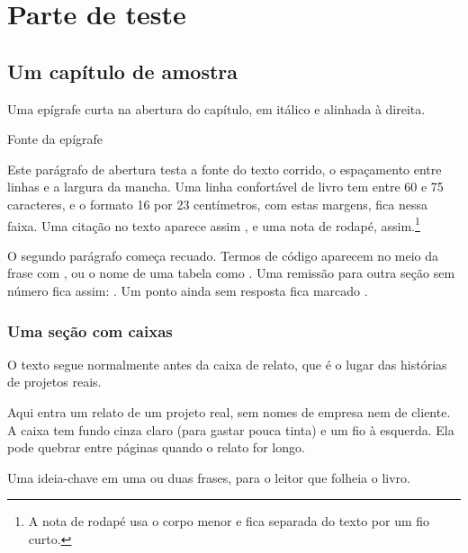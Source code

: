 \documentclass[11pt,twoside,openright,showtrims]{memoir}
\begin{document}
\mainmatter
\part{Parte de teste}
\label{parte:teste}

\chapter{Um capítulo de amostra}
\label{cap:amostra}

\epigraph{Uma epígrafe curta na abertura do capítulo, em itálico e alinhada à direita.}{Fonte da epígrafe}


Este parágrafo de abertura testa a fonte do texto corrido, o espaçamento entre linhas
e a largura da mancha. Uma linha confortável de livro tem entre 60 e 75 caracteres,
e o formato 16 por 23 centímetros, com estas margens, fica nessa faixa. Uma citação no
texto aparece assim \parencite{kimball2013}, e uma nota de rodapé, assim.\footnote{A nota
de rodapé usa o corpo menor e fica separada do texto por um fio curto.}

O segundo parágrafo começa recuado. Termos de código aparecem no meio da frase com
,  ou o nome de uma tabela como .
Uma remissão para outra seção sem número fica assim: .
Um ponto ainda sem resposta fica marcado .

\section{Uma seção com caixas}
\label{sec:amostra-caixas}

O texto segue normalmente antes da caixa de relato, que é o lugar das histórias de
projetos reais.

\begin{relato}
Aqui entra um relato de um projeto real, sem nomes de empresa nem de cliente. A caixa
tem fundo cinza claro (para gastar pouca tinta) e um fio à esquerda. Ela pode
quebrar entre páginas quando o relato for longo.
\end{relato}

\begin{destaque}
Uma ideia-chave em uma ou duas frases, para o leitor que folheia o livro.
\end{destaque}
\end{document}
